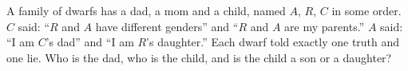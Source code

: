 A family of dwarfs has a dad, a mom and a child, named $A$, $R$, $C$ in some order. $C$ said: ``$R$ and $A$ have different genders'' and ``$R$ and $A$ are my parents.'' $A$ said: ``I am $C$'s dad'' and ``I am $R$'s daughter.'' Each dwarf told exactly one truth and one lie. Who is the dad, who is the child, and is the child a son or a daughter?
